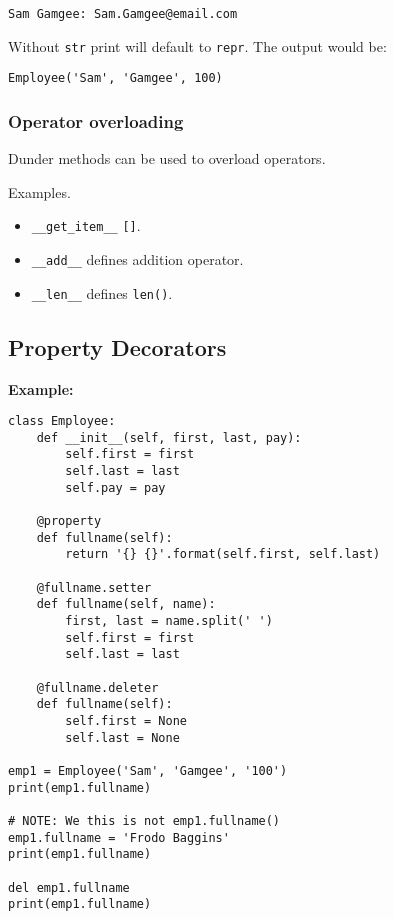 \vfill\null
\columnbreak

\begin{mdframed}[backgroundcolor=magenta!10,linecolor=magenta,nobreak=true]
\begin{verbatim}
Sam Gamgee: Sam.Gamgee@email.com
\end{verbatim}
\end{mdframed}


Without \texttt{str} print will default to \texttt{repr}. The output would be:\\

\begin{mdframed}[backgroundcolor=magenta!10,linecolor=magenta]
\begin{verbatim}
Employee('Sam', 'Gamgee', 100) 
\end{verbatim}
\end{mdframed}


\subsubsection*{Operator overloading}

Dunder methods can be used to overload operators.

Examples.\\

\begin{itemize}
\item \texttt{\_\_get\_item\_\_} \texttt{[]}.
\item \texttt{\_\_add\_\_} defines addition operator.
\item \texttt{\_\_len\_\_} defines \texttt{len()}.
\end{itemize}

\subsection*{Property Decorators}

\textbf{Example:}

\begin{mdframed}[backgroundcolor=gray!10,linecolor=Firebrick4]
\begin{verbatim}
class Employee:
    def __init__(self, first, last, pay):
        self.first = first
        self.last = last
        self.pay = pay
    
    @property
    def fullname(self):
        return '{} {}'.format(self.first, self.last)

    @fullname.setter
    def fullname(self, name):
        first, last = name.split(' ')
        self.first = first
        self.last = last

    @fullname.deleter
    def fullname(self):
        self.first = None
        self.last = None

emp1 = Employee('Sam', 'Gamgee', '100')
print(emp1.fullname)

# NOTE: We this is not emp1.fullname()
emp1.fullname = 'Frodo Baggins'
print(emp1.fullname)

del emp1.fullname
print(emp1.fullname)
\end{verbatim}
\end{mdframed}


